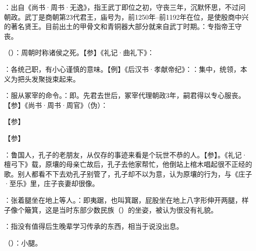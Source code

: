 {
\item {}：出自《尚书·周书·无逸》，指王武丁即位之初，守丧三年，沉默怀思，不过问朝政。武丁是商朝第23代君王，庙号为，前1250年--前1192年在位，是使殷商中兴的著名贤王。目前出土的甲骨文和青铜器大部分就来自武丁时期。：专指帝王守丧。
\item {}（）：周朝时称诸侯之死。【参】《礼记·曲礼下》：
\item {}：各统己职，有小心谨慎的意味。【例】《后汉书·孝献帝纪》：：集中，统领，本义为把头发聚拢束起来。
\item {}：服从冢宰的命令。：即。先君去世后，冢宰代理朝政3年，嗣君得以专心服丧。【参】《尚书·周书·周官》（伪）：
}
{}


{【参】}
{}


{【参】}
{}


{
\item {}：鲁国人，孔子的老朋友，从仅存的事迹来看是个玩世不恭的人。【参】。《礼记·檀弓下》载，原壤的母亲亡故后，孔子去他家帮忙，他倒站上棺木唱起很不正经的歌。别人都看不下去劝孔子别管了，孔子却不以为意，认为原壤的行为，与《庄子·至乐》里，庄子丧妻却很像。

\item {}：张着腿坐在地上等人。：即夷踞，也叫箕踞，屁股坐在地上八字形伸开两腿，样子像个簸箕，这是当时东部少数民族（）的坐姿，被认为很没有礼貌。
\item {}：指没有值得后生晚辈学习传承的东西，相当于说没出息。
\item {}（）：小腿。
}
{}


